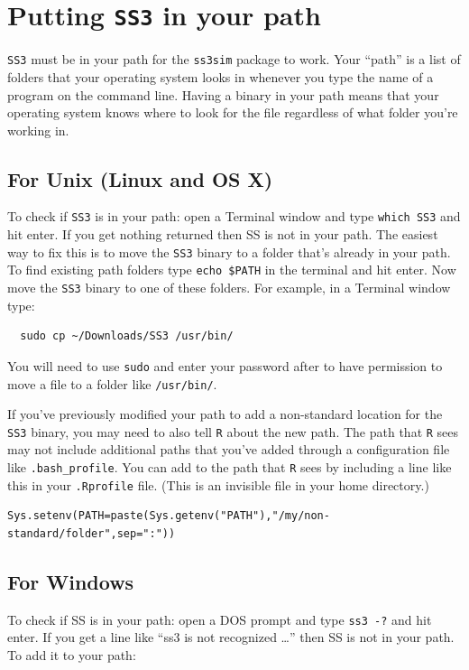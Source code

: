 \documentclass[12pt]{article}
\begin{document}
\section{Putting \texttt{SS3} in your path}
\texttt{SS3} must be in your path for the \texttt{ss3sim} package to work. Your 
``path'' is a list of folders that your operating system looks in whenever you 
type the name of a program on the command line. Having a binary in your path 
means that your operating system knows where to look for the file regardless of 
what folder you're working in. 

\subsection{For Unix (Linux and OS X)}
To check if \texttt{SS3} is in your path: open a Terminal window and type 
\texttt{which SS3} and hit enter. If you get nothing returned then SS is not in 
your path. The easiest way to fix this is to move the \texttt{SS3} binary to a 
folder that's already in your path. To find existing path folders type 
\texttt{echo \$PATH} in the terminal and hit enter. Now move the \texttt{SS3} 
binary to one of these folders. For example, in a Terminal window type:

\begin{verbatim}
  sudo cp ~/Downloads/SS3 /usr/bin/
\end{verbatim}

\noindent
You will need to use \texttt{sudo} and enter your password after to have 
permission to move a file to a folder like \texttt{/usr/bin/}.

If you've previously modified your path to add a non-standard location for the 
\texttt{SS3} binary, you may need to also tell \texttt{R} about the new path. 
The path that \texttt{R} sees may not include additional paths that you've 
added through a configuration file like \texttt{.bash\_profile}. You can add to 
the path that \texttt{R} sees by including a line like this in your 
\texttt{.Rprofile} file. (This is an invisible file in your home directory.)

\begin{verbatim}
Sys.setenv(PATH=paste(Sys.getenv("PATH"),"/my/non-standard/folder",sep=":")) 
\end{verbatim}

\subsection{For Windows}
To check if SS is in your path: open a DOS prompt and type \texttt{ss3 -?} and 
hit enter. If you get a line like ``ss3 is not recognized \ldots'' then SS is 
not in your path. To add it to your path:
\end{document}
